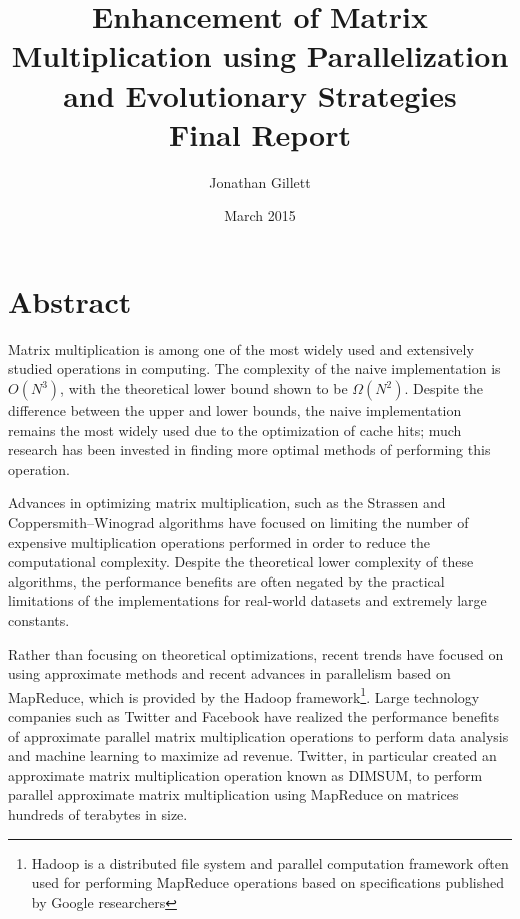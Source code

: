 \documentclass[oneside]{article}
\title{Enhancement of Matrix Multiplication using Parallelization and Evolutionary Strategies \\ \vspace{2 mm} {\Large Final Report}}
\author{Jonathan Gillett}
\date{March 2015}
\begin{document}
\maketitle



\section{Abstract}

\doublespacing
Matrix multiplication is among one of the most widely used and extensively studied operations in computing\cite{raz2002complexity}. The complexity of the naive implementation is $O(N^{3})$\cite{raz2002complexity}, with the theoretical lower bound shown to be $\Omega(N^{2})$\cite{raz2002complexity}. Despite the difference between the upper and lower bounds, the naive implementation remains the most widely used due to the optimization of cache hits\cite{note2002reducing}; much research has been invested in finding more optimal methods of performing this operation.

Advances in optimizing matrix multiplication, such as the Strassen and Coppersmith–Winograd algorithms\cite{huss1996implementation, coppersmith1987matrix} have focused on limiting the number of expensive multiplication operations performed in order to reduce the computational complexity. Despite the theoretical lower complexity of these algorithms, the performance benefits are often negated by the practical limitations of the implementations for real-world datasets and extremely large constants\cite{robinson2005toward}.

Rather than focusing on theoretical optimizations, recent trends have focused on using approximate methods and recent advances in parallelism based on MapReduce, which is provided by the Hadoop framework\footnote{Hadoop is a distributed file system and parallel computation framework\cite{shvachko2010hadoop} often used for performing MapReduce operations based on specifications published by Google researchers\cite{dean2008mapreduce}}. Large technology companies such as Twitter and Facebook have realized the performance benefits of approximate parallel matrix multiplication operations to perform data analysis and machine learning to maximize ad revenue. Twitter, in particular created an approximate matrix multiplication operation known as DIMSUM, to perform parallel approximate matrix multiplication using MapReduce on matrices hundreds of terabytes in size\cite{zadeh2013dimension}.
\end{document}
